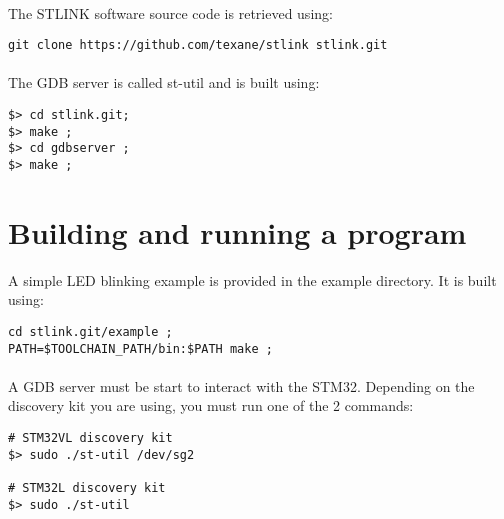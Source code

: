 \documentclass[a4paper, 11pt]{article}
\begin{document}
\paragraph{}
The STLINK software source code is retrieved using:\\
\begin{small}
\begin{lstlisting}[frame=tb]
git clone https://github.com/texane/stlink stlink.git
\end{lstlisting}
\end{small}

\paragraph{}
The GDB server is called st-util and is built using:\\
\begin{small}
\begin{lstlisting}[frame=tb]
$> cd stlink.git;
$> make ;
$> cd gdbserver ;
$> make ;
\end{lstlisting}
\end{small}


\newpage

\section{Building and running a program}
A simple LED blinking example is provided in the example directory. It is built using:\\
\begin{small}
\begin{lstlisting}[frame=tb]
cd stlink.git/example ;
PATH=$TOOLCHAIN_PATH/bin:$PATH make ;
\end{lstlisting}
\end{small}

\paragraph{}
A GDB server must be start to interact with the STM32.
Depending on the discovery kit you are using, you must
run one of the 2 commands:\\
\begin{small}
\begin{lstlisting}[frame=tb]
# STM32VL discovery kit
$> sudo ./st-util /dev/sg2

# STM32L discovery kit
$> sudo ./st-util
\end{lstlisting}
\end{small}
\end{document}
